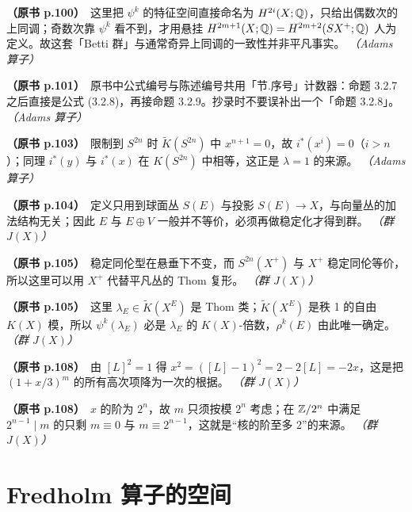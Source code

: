 \noindent \textbf{（原书 p.100）}\ 这里把 $\psi^k$ 的特征空间直接命名为 $H^{2i}(X;\mathbb{Q})$，只给出偶数次的上同调；奇数次靠 $\psi^k$ 看不到，才用悬挂 $H^{2m+1}(X;\mathbb{Q})=H^{2m+2}(SX^+;\mathbb{Q})$ 人为定义。故这套「Betti 群」与通常奇异上同调的一致性并非平凡事实。 \textit{（Adams 算子）}\par\smallskip

\noindent \textbf{（原书 p.101）}\ 原书中公式编号与陈述编号共用「节.序号」计数器：命题 3.2.7 之后直接是公式 (3.2.8)，再接命题 3.2.9。抄录时不要误补出一个「命题 3.2.8」。 \textit{（Adams 算子）}\par\smallskip

\noindent \textbf{（原书 p.103）}\ 限制到 $S^{2n}$ 时 $\tilde K(S^{2n})$ 中 $x^{n+1}=0$，故 $i^*(x^i)=0$（$i>n$）；同理 $i^*(y)$ 与 $i^*(x)$ 在 $K(S^{2n})$ 中相等，这正是 $\lambda=1$ 的来源。 \textit{（Adams 算子）}\par\smallskip

\noindent \textbf{（原书 p.104）}\ 定义只用到球面丛 $S(E)$ 与投影 $S(E)\to X$，与向量丛的加法结构无关；因此 $E$ 与 $E\oplus V$ 一般并不等价，必须再做稳定化才得到群。 \textit{（群 $J(X)$）}\par\smallskip

\noindent \textbf{（原书 p.105）}\ 稳定同伦型在悬垂下不变，而 $S^{2n}(X^+)$ 与 $X^+$ 稳定同伦等价，所以这里可以用 $X^+$ 代替平凡丛的 Thom 复形。 \textit{（群 $J(X)$）}\par\smallskip

\noindent \textbf{（原书 p.105）}\ 这里 $\lambda_E\in\tilde K(X^E)$ 是 Thom 类；$\tilde K(X^E)$ 是秩 1 的自由 $K(X)$ 模，所以 $\psi^k(\lambda_E)$ 必是 $\lambda_E$ 的 $K(X)$-倍数，$\rho^k(E)$ 由此唯一确定。 \textit{（群 $J(X)$）}\par\smallskip

\noindent \textbf{（原书 p.108）}\ 由 $[L]^2=1$ 得 $x^2=([L]-1)^2=2-2[L]=-2x$，这是把 $(1+x/3)^m$ 的所有高次项降为一次的根据。 \textit{（群 $J(X)$）}\par\smallskip

\noindent \textbf{（原书 p.108）}\ $x$ 的阶为 $2^n$，故 $m$ 只须按模 $2^n$ 考虑；在 $\mathbb{Z}/2^n$ 中满足 $2^{n-1}\mid m$ 的只剩 $m\equiv0$ 与 $m\equiv2^{n-1}$，这就是“核的阶至多 2”的来源。 \textit{（群 $J(X)$）}\par\smallskip

\section*{Fredholm 算子的空间}

